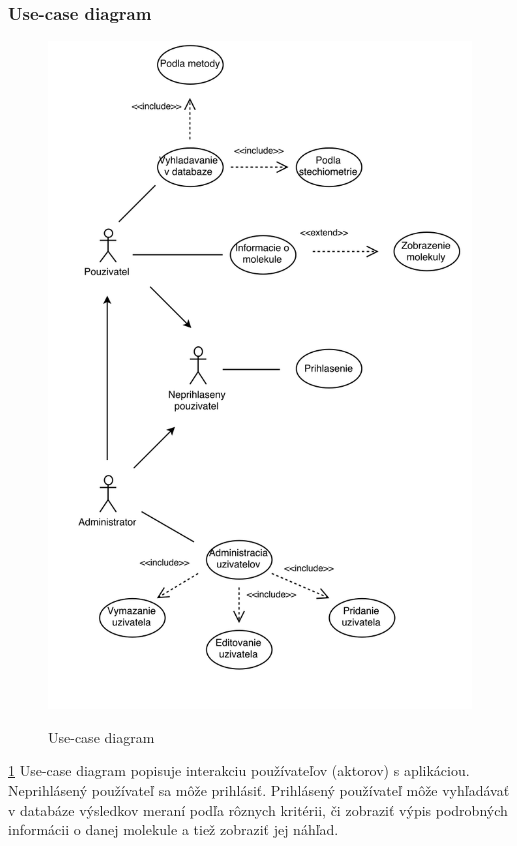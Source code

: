 \documentclass[12pt,a4paper]{article}
\begin{document}
\subsubsection{Use-case diagram}
\begin{figure}[H]
	\caption{Use-case diagram}
	\includegraphics[width=\textwidth]{use-case}
	\label{fig:use_case}
\end{figure}
\ref{fig:use_case}
Use-case diagram popisuje interakciu používateľov (aktorov) s aplikáciou. Neprihlásený používateľ sa môže prihlásiť. Prihlásený používateľ môže vyhľadávať v databáze výsledkov meraní podľa rôznych kritérii, či zobraziť výpis podrobných informácii o danej molekule a tiež zobraziť jej náhľad.
\end{document}
